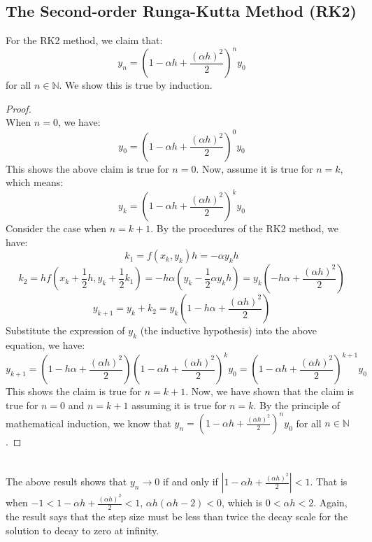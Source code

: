 \documentclass{article}
\def\NN{{\mathbb N}}
\begin{document}
\subsection{The Second-order Runga-Kutta Method (RK2)}
For the RK2 method, we claim that:
\begin{equation}
  y_n = (1-\alpha h + \frac{(\alpha h)^2}{2})^n y_0
\end{equation}
for all \(n\in \NN\). We show this is true by induction.
\begin{proof}\text{ }\\
  When \(n=0\), we have:
  \begin{equation}
    y_0 = (1-\alpha h + \frac{(\alpha h)^2}{2})^0 y_0
  \end{equation}
  This shows the above claim is true for \(n=0\). Now, assume it is true for \(n=k\), which means:
  \begin{equation}
    y_k = (1-\alpha h + \frac{(\alpha h)^2}{2})^k y_0
  \end{equation}
  Consider the case when \(n = k+1\). By the procedures of the RK2 method, we have:
  \begin{equation}
    k_1 = f(x_k, y_k)h = -\alpha y_k h
  \end{equation}
  \begin{equation}
    k_2 = h f(x_k +\frac{1}{2}h, y_k + \frac{1}{2}k_1) = -h\alpha(y_k  - \frac{1}{2} \alpha y_k h) =y_k(-h\alpha +\frac{(\alpha h)^2}{2})
  \end{equation}
  \begin{equation}
    y_{k+1} = y_k + k_2 = y_k(1-h\alpha +\frac{(\alpha h)^2}{2})
  \end{equation}
  Substitute the expression of \(y_k\) (the inductive hypothesis) into the above equation, we have:
  \begin{equation}
    y_{k+1} = (1-h\alpha +\frac{(\alpha h)^2}{2}) (1-\alpha h + \frac{(\alpha h)^2}{2})^k y_0 = (1-\alpha h + \frac{(\alpha h)^2}{2})^{k+1} y_0
  \end{equation}
  This shows the claim is true for \(n=k+1\). Now, we have shown that the claim is true for \(n=0\) and \(n=k+1\)
  assuming it is true for \(n=k\). By the principle of mathematical induction, we know that
  \(  y_n = (1-\alpha h + \frac{(\alpha h)^2}{2})^n y_0\) for all \(n\in \NN\).
\end{proof}\text{ }\\
The above result shows that \(y_n\to 0\) if and only if \(|1-\alpha h + \frac{(\alpha h)^2}{2}|< 1\).
That is when \(-1<1-\alpha h + \frac{(\alpha h)^2}{2}<1\), \(\alpha h(\alpha h -2) < 0\), which is \(0<\alpha h <2\).
Again, the result says that the step size must be
less than twice the decay scale for the solution to decay to zero at infinity.
\end{document}
